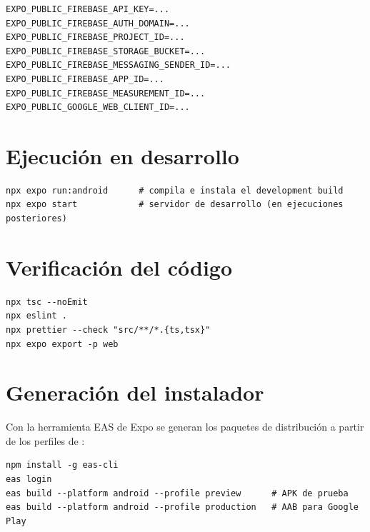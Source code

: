 \begin{lstlisting}[language={}, numbers=none, caption={Variables de entorno (valores de ejemplo)}, label={lst:env}]
EXPO_PUBLIC_FIREBASE_API_KEY=...
EXPO_PUBLIC_FIREBASE_AUTH_DOMAIN=...
EXPO_PUBLIC_FIREBASE_PROJECT_ID=...
EXPO_PUBLIC_FIREBASE_STORAGE_BUCKET=...
EXPO_PUBLIC_FIREBASE_MESSAGING_SENDER_ID=...
EXPO_PUBLIC_FIREBASE_APP_ID=...
EXPO_PUBLIC_FIREBASE_MEASUREMENT_ID=...
EXPO_PUBLIC_GOOGLE_WEB_CLIENT_ID=...
\end{lstlisting}

\section{Ejecución en desarrollo}

\begin{lstlisting}[language={}, numbers=none, caption={Compilación y ejecución en Android}, label={lst:ejecucion}]
npx expo run:android      # compila e instala el development build
npx expo start            # servidor de desarrollo (en ejecuciones posteriores)
\end{lstlisting}

\section{Verificación del código}

\begin{lstlisting}[language={}, numbers=none, caption={Verificaciones estáticas}, label={lst:verificacion}]
npx tsc --noEmit
npx eslint .
npx prettier --check "src/**/*.{ts,tsx}"
npx expo export -p web
\end{lstlisting}

\section{Generación del instalador}

Con la herramienta EAS de Expo se generan los paquetes de distribución a
partir de los perfiles de :

\begin{lstlisting}[language={}, numbers=none, caption={Compilación con EAS}, label={lst:eas}]
npm install -g eas-cli
eas login
eas build --platform android --profile preview      # APK de prueba
eas build --platform android --profile production   # AAB para Google Play
\end{lstlisting}
